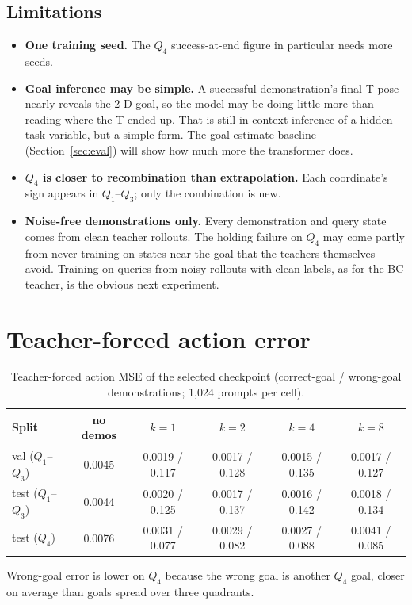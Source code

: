 \subsection{Limitations}
\label{sec:limitations}
\begin{itemize}
  \item \textbf{One training seed.} The $Q_4$ success-at-end figure in particular needs more seeds. 
  \item \textbf{Goal inference may be simple.} A successful demonstration's final T pose nearly reveals the 2-D goal, so the model may
    be doing little more than reading where the T ended up. That is still in-context inference of a hidden task variable, but a
    simple form. The goal-estimate baseline (Section~\ref{sec:eval}) will show how much more the transformer does. 
  \item \textbf{$Q_4$ is closer to recombination than extrapolation.} Each coordinate's sign appears in $Q_1$--$Q_3$; only the
    combination is new.
  \item \textbf{Noise-free demonstrations only.} Every demonstration and query state comes from clean teacher rollouts. The holding
    failure on $Q_4$ may come partly from never training on states near the goal that the teachers themselves avoid. Training on
    queries from noisy rollouts with clean labels, as for the BC teacher, is the obvious next experiment.
\end{itemize}

\appendix
\section{Teacher-forced action error}
\label{app:action-error}
\begin{table}[h]
\centering
\caption{Teacher-forced action MSE of the selected checkpoint (correct-goal / wrong-goal demonstrations; 1{,}024 prompts per cell).}
\label{tab:action-error}
\small
\begin{tabular}{lccccc}
\toprule
Split & no demos & $k{=}1$ & $k{=}2$ & $k{=}4$ & $k{=}8$ \\
\midrule
val ($Q_1$--$Q_3$) & 0.0045 & 0.0019 / 0.117 & 0.0017 / 0.128 & 0.0015 / 0.135 & 0.0017 / 0.127 \\
test ($Q_1$--$Q_3$) & 0.0044 & 0.0020 / 0.125 & 0.0017 / 0.137 & 0.0016 / 0.142 & 0.0018 / 0.134 \\
test ($Q_4$) & 0.0076 & 0.0031 / 0.077 & 0.0029 / 0.082 & 0.0027 / 0.088 & 0.0041 / 0.085 \\
\bottomrule
\end{tabular}
\end{table}
Wrong-goal error is lower on $Q_4$ because the wrong goal is another $Q_4$ goal, closer on average than goals spread over three quadrants.

